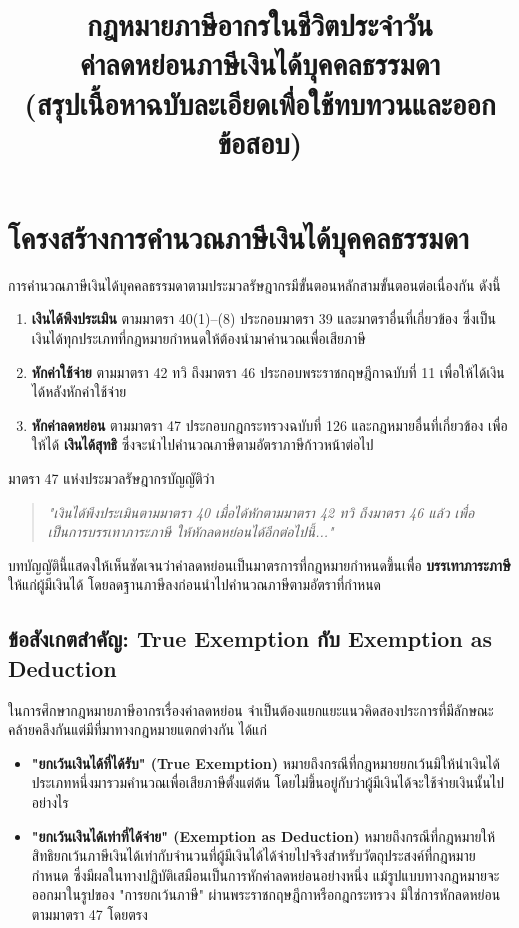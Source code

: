 \documentclass[12pt,a4paper]{article}
\title{\Huge กฎหมายภาษีอากรในชีวิตประจำวัน \\[0.3em] \Large ค่าลดหย่อนภาษีเงินได้บุคคลธรรมดา \\[0.2em] \large (สรุปเนื้อหาฉบับละเอียดเพื่อใช้ทบทวนและออกข้อสอบ)}
\author{}
\date{}
\newcommand{\hilight}[1]{\textbf{#1}}
\begin{document}
\maketitle
\thispagestyle{fancy}

\renewcommand{\contentsname}{สารบัญ}
\tableofcontents
\newpage

\section{โครงสร้างการคำนวณภาษีเงินได้บุคคลธรรมดา}

การคำนวณภาษีเงินได้บุคคลธรรมดาตามประมวลรัษฎากรมีขั้นตอนหลักสามขั้นตอนต่อเนื่องกัน ดังนี้

\begin{enumerate}
    \item \textbf{เงินได้พึงประเมิน} ตามมาตรา 40(1)--(8) ประกอบมาตรา 39 และมาตราอื่นที่เกี่ยวข้อง ซึ่งเป็นเงินได้ทุกประเภทที่กฎหมายกำหนดให้ต้องนำมาคำนวณเพื่อเสียภาษี
    \item \textbf{หักค่าใช้จ่าย} ตามมาตรา 42 ทวิ ถึงมาตรา 46 ประกอบพระราชกฤษฎีกาฉบับที่ 11 เพื่อให้ได้เงินได้หลังหักค่าใช้จ่าย
    \item \textbf{หักค่าลดหย่อน} ตามมาตรา 47 ประกอบกฎกระทรวงฉบับที่ 126 และกฎหมายอื่นที่เกี่ยวข้อง เพื่อให้ได้ \hilight{เงินได้สุทธิ} ซึ่งจะนำไปคำนวณภาษีตามอัตราภาษีก้าวหน้าต่อไป
\end{enumerate}

มาตรา 47 แห่งประมวลรัษฎากรบัญญัติว่า

\begin{quote}
\textit{"เงินได้พึงประเมินตามมาตรา 40 เมื่อได้หักตามมาตรา 42 ทวิ ถึงมาตรา 46 แล้ว เพื่อเป็นการบรรเทาภาระภาษี ให้หักลดหย่อนได้อีกต่อไปนี้..."}
\end{quote}

บทบัญญัตินี้แสดงให้เห็นชัดเจนว่าค่าลดหย่อนเป็นมาตรการที่กฎหมายกำหนดขึ้นเพื่อ \hilight{บรรเทาภาระภาษี} ให้แก่ผู้มีเงินได้ โดยลดฐานภาษีลงก่อนนำไปคำนวณภาษีตามอัตราที่กำหนด

\subsection*{ข้อสังเกตสำคัญ: True Exemption กับ Exemption as Deduction}

ในการศึกษากฎหมายภาษีอากรเรื่องค่าลดหย่อน จำเป็นต้องแยกแยะแนวคิดสองประการที่มีลักษณะคล้ายคลึงกันแต่มีที่มาทางกฎหมายแตกต่างกัน ได้แก่

\begin{itemize}
    \item \hilight{"ยกเว้นเงินได้ที่ได้รับ" (True Exemption)} หมายถึงกรณีที่กฎหมายยกเว้นมิให้นำเงินได้ประเภทหนึ่งมารวมคำนวณเพื่อเสียภาษีตั้งแต่ต้น โดยไม่ขึ้นอยู่กับว่าผู้มีเงินได้จะใช้จ่ายเงินนั้นไปอย่างไร
    \item \hilight{"ยกเว้นเงินได้เท่าที่ได้จ่าย" (Exemption as Deduction)} หมายถึงกรณีที่กฎหมายให้สิทธิยกเว้นภาษีเงินได้เท่ากับจำนวนที่ผู้มีเงินได้ได้จ่ายไปจริงสำหรับวัตถุประสงค์ที่กฎหมายกำหนด ซึ่งมีผลในทางปฏิบัติเสมือนเป็นการหักค่าลดหย่อนอย่างหนึ่ง แม้รูปแบบทางกฎหมายจะออกมาในรูปของ "การยกเว้นภาษี" ผ่านพระราชกฤษฎีกาหรือกฎกระทรวง มิใช่การหักลดหย่อนตามมาตรา 47 โดยตรง
\end{itemize}
\end{document}
